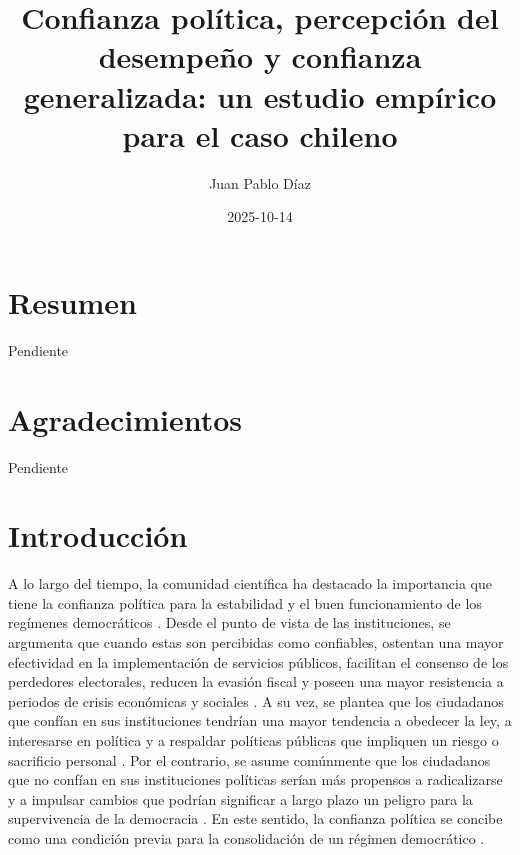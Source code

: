 \documentclass[12pt,twoside]{templates/facsothesis}
\title{Confianza política, percepción del desempeño y confianza generalizada: un estudio empírico para el caso chileno}
\author{Juan Pablo Díaz}
\date{2025-10-14}
\begin{document}

  \maketitle

\frontmatter %
\pagestyle{empty} %



  \setcounter{tocdepth}{1}
  \setlength{\parskip}{0pt}
  \tableofcontents

\setlength\parskip{1em plus 0.1em minus 0.2em}

  \listoftables

  \listoffigures



\mainmatter %
\pagestyle{fancyplain} %

\chapter*{Resumen}\label{resumen}

Pendiente

\chapter*{Agradecimientos}\label{agradecimientos}

Pendiente

\chapter{Introducción}\label{introducciuxf3n}

A lo largo del tiempo, la comunidad científica ha destacado la importancia que tiene la confianza política para la estabilidad y el buen funcionamiento de los regímenes democráticos \citep{zmerliPoliticalTrust2022}. Desde el punto de vista de las instituciones, se argumenta que cuando estas son percibidas como confiables, ostentan una mayor efectividad en la implementación de servicios públicos, facilitan el consenso de los perdedores electorales, reducen la evasión fiscal y poseen una mayor resistencia a periodos de crisis económicas y sociales \citep{vandermeerDeeplyRootedConcern2017, newtonSocialPoliticalTrust2017, citrinPoliticalTrustCynical2018}. A su vez, se plantea que los ciudadanos que confían en sus instituciones tendrían una mayor tendencia a obedecer la ley, a interesarse en política y a respaldar políticas públicas que impliquen un riesgo o sacrificio personal \citep{citrinPoliticalTrustCynical2018, zmerliPoliticalTrust2022}. Por el contrario, se asume comúnmente que los ciudadanos que no confían en sus instituciones políticas serían más propensos a radicalizarse y a impulsar cambios que podrían significar a largo plazo un peligro para la supervivencia de la democracia \citep{andersonSensitiveLeftImpervious2008}. En este sentido, la confianza política se concibe como una condición previa para la consolidación de un régimen democrático \citep{vandermeerDeeplyRootedConcern2017}.
\end{document}
